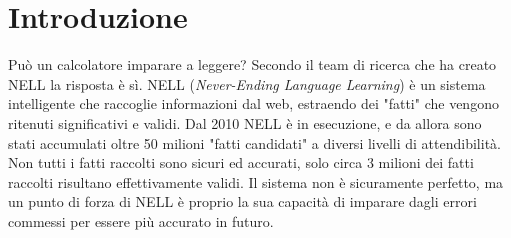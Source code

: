 \section*{Introduzione}
Può un calcolatore imparare a leggere? Secondo il team di ricerca che ha creato NELL la risposta è sì.\newline
NELL (\textit{Never-Ending Language Learning}) è un sistema intelligente che raccoglie informazioni dal web, estraendo dei "fatti" che vengono ritenuti significativi e validi.
Dal 2010 NELL è in esecuzione, e da allora sono stati accumulati oltre 50 milioni "fatti candidati" a diversi livelli di attendibilità.\newline
Non tutti i fatti raccolti sono sicuri ed accurati, solo circa 3 milioni dei fatti raccolti risultano effettivamente validi.
Il sistema non è sicuramente perfetto, ma un punto di forza di NELL è proprio la sua capacità di imparare dagli errori commessi per essere più accurato in futuro.
\newpage